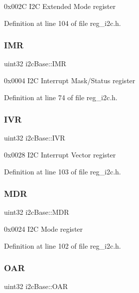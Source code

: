 0x002C I2C Extended Mode register 

Definition at line 104 of file reg\+\_\+i2c.\+h.

\mbox{\label{structi2cBase_a74d027eb9dbb6d578a04eeddb21db12a}} 
\subsubsection{\texorpdfstring{I\+MR}{IMR}}
{\footnotesize\ttfamily uint32 i2c\+Base\+::\+I\+MR}

0x0004 I2C Interrupt Mask/\+Status register 

Definition at line 74 of file reg\+\_\+i2c.\+h.

\mbox{\label{structi2cBase_a5fb3523b1d9f0926fb40b1301a43bfed}} 
\subsubsection{\texorpdfstring{I\+VR}{IVR}}
{\footnotesize\ttfamily uint32 i2c\+Base\+::\+I\+VR}

0x0028 I2C Interrupt Vector register 

Definition at line 103 of file reg\+\_\+i2c.\+h.

\mbox{\label{structi2cBase_a7d562365d45a5eb2acc131f13f8c3829}} 
\subsubsection{\texorpdfstring{M\+DR}{MDR}}
{\footnotesize\ttfamily uint32 i2c\+Base\+::\+M\+DR}

0x0024 I2C Mode register 

Definition at line 102 of file reg\+\_\+i2c.\+h.

\mbox{\label{structi2cBase_a96c4486bd2527a84eed4bd18803b5826}} 
\subsubsection{\texorpdfstring{O\+AR}{OAR}}
{\footnotesize\ttfamily uint32 i2c\+Base\+::\+O\+AR}

